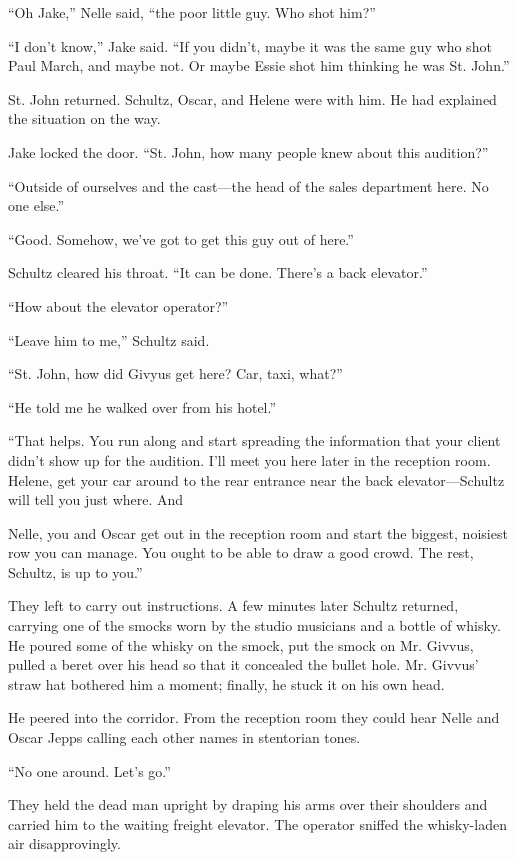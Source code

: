 \documentclass{novel}
\begin{document}
“Oh Jake,” Nelle said, “the poor little guy. Who shot him?”

“I don’t know,” Jake said. “If you didn’t, maybe it was the same guy who shot Paul March, and maybe not. Or maybe Essie shot him thinking he was St. John.”

St. John returned. Schultz, Oscar, and Helene were with him. He had explained the situation on the way.

Jake locked the door. “St. John, how many people knew about this audition?”

“Outside of ourselves and the cast—the head of the sales department here. No one else.”

“Good. Somehow, we’ve got to get this guy out of here.”

Schultz cleared his throat. “It can be done. There’s a back elevator.”

“How about the elevator operator?”

“Leave him to me,” Schultz said.

“St. John, how did Givyus get here? Car, taxi, what?”

“He told me he walked over from his hotel.”

“That helps. You run along and start spreading the information that your client didn’t show up for the audition. I'll meet you here later in the reception room. Helene, get your car around to the rear entrance near the back elevator—Schultz will tell you just where. And

Nelle, you and Oscar get out in the reception room and start the biggest, noisiest row you can manage. You ought to be able to draw a good crowd. The rest, Schultz, is up to you.”

They left to carry out instructions. A few minutes later Schultz returned, carrying one of the smocks worn by the studio musicians and a bottle of whisky. He poured some of the whisky on the smock, put the smock on Mr. Givvus, pulled a beret over his head so that it concealed the bullet hole. Mr. Givvus’ straw hat bothered him a moment; finally, he stuck it on his own head.

He peered into the corridor. From the reception room they could hear Nelle and Oscar Jepps calling each other names in stentorian tones.

“No one around. Let’s go.”

They held the dead man upright by draping his arms over their shoulders and carried him to the waiting freight elevator. The operator sniffed the whisky-laden air disapprovingly.
\end{document}
